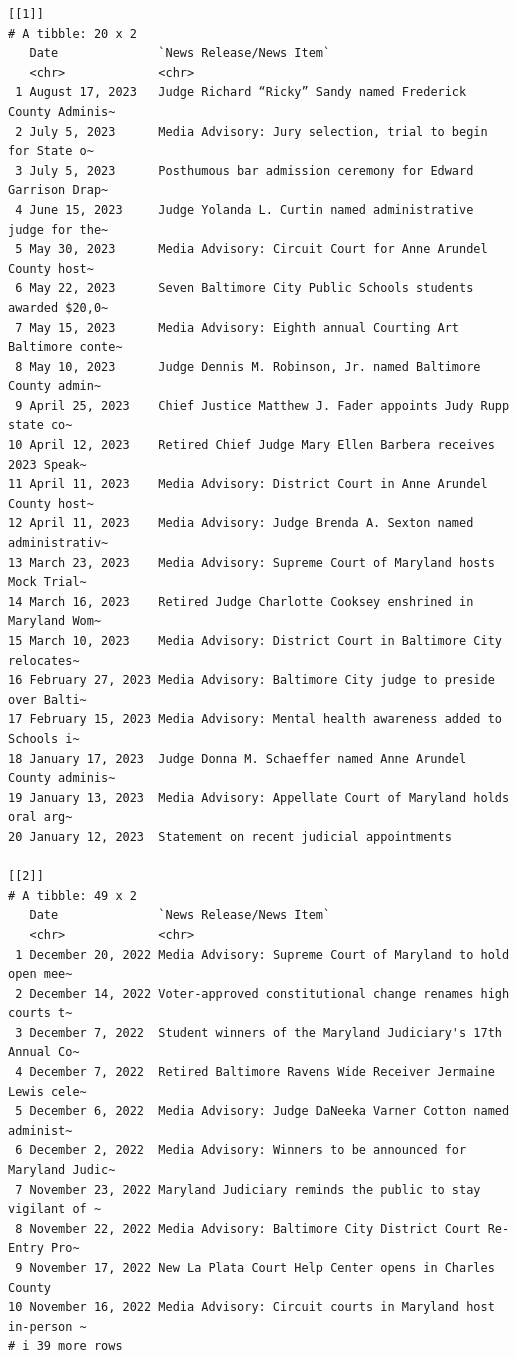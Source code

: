 \documentclass[
  letterpaper,
  DIV=11,
  numbers=noendperiod]{scrreprt}
\begin{document}
\begin{verbatim}
[[1]]
# A tibble: 20 x 2
   Date              `News Release/News Item`                                   
   <chr>             <chr>                                                      
 1 August 17, 2023   Judge Richard “Ricky” Sandy named Frederick County Adminis~
 2 July 5, 2023      Media Advisory: Jury selection, trial to begin for State o~
 3 July 5, 2023      Posthumous bar admission ceremony for Edward Garrison Drap~
 4 June 15, 2023     Judge Yolanda L. Curtin named administrative judge for the~
 5 May 30, 2023      Media Advisory: Circuit Court for Anne Arundel County host~
 6 May 22, 2023      Seven Baltimore City Public Schools students awarded $20,0~
 7 May 15, 2023      Media Advisory: Eighth annual Courting Art Baltimore conte~
 8 May 10, 2023      Judge Dennis M. Robinson, Jr. named Baltimore County admin~
 9 April 25, 2023    Chief Justice Matthew J. Fader appoints Judy Rupp state co~
10 April 12, 2023    Retired Chief Judge Mary Ellen Barbera receives 2023 Speak~
11 April 11, 2023    Media Advisory: District Court in Anne Arundel County host~
12 April 11, 2023    Media Advisory: Judge Brenda A. Sexton named administrativ~
13 March 23, 2023    Media Advisory: Supreme Court of Maryland hosts Mock Trial~
14 March 16, 2023    Retired Judge Charlotte Cooksey enshrined in  Maryland Wom~
15 March 10, 2023    Media Advisory: District Court in Baltimore City relocates~
16 February 27, 2023 Media Advisory: Baltimore City judge to preside over Balti~
17 February 15, 2023 Media Advisory: Mental health awareness added to Schools i~
18 January 17, 2023  Judge Donna M. Schaeffer named Anne Arundel County adminis~
19 January 13, 2023  Media Advisory: Appellate Court of Maryland holds oral arg~
20 January 12, 2023  Statement on recent judicial appointments                  

[[2]]
# A tibble: 49 x 2
   Date              `News Release/News Item`                                   
   <chr>             <chr>                                                      
 1 December 20, 2022 Media Advisory: Supreme Court of Maryland to hold open mee~
 2 December 14, 2022 Voter-approved constitutional change renames high courts t~
 3 December 7, 2022  Student winners of the Maryland Judiciary's 17th Annual Co~
 4 December 7, 2022  Retired Baltimore Ravens Wide Receiver Jermaine Lewis cele~
 5 December 6, 2022  Media Advisory: Judge DaNeeka Varner Cotton named administ~
 6 December 2, 2022  Media Advisory: Winners to be announced for Maryland Judic~
 7 November 23, 2022 Maryland Judiciary reminds the public to stay vigilant of ~
 8 November 22, 2022 Media Advisory: Baltimore City District Court Re-Entry Pro~
 9 November 17, 2022 New La Plata Court Help Center opens in Charles County     
10 November 16, 2022 Media Advisory: Circuit courts in Maryland host in-person ~
# i 39 more rows


\end{verbatim}
\end{document}
